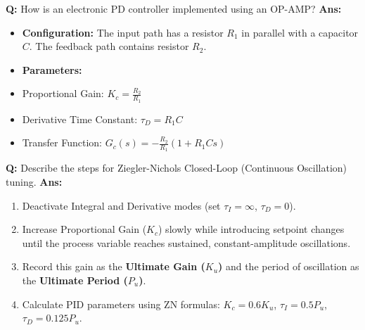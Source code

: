 \documentclass[10pt,a4paper,twocolumn]{article}
\begin{document}
\begin{tcolorbox}[
  colback=white,
  colframe=UnitColorTwo,
  colbacktitle=gray!10!white,
  coltitle=black,
  fonttitle=\bfseries\sffamily\small,
  title={Unit II $\bullet$ Card 7: OP-AMP PD Controller Circuit},
  boxrule=1.2pt,
  arc=2mm,
  outer arc=2mm,
  boxsep=1.5mm,
  top=1mm,
  bottom=1mm,
  left=1.5mm,
  right=1.5mm,
  before skip=2.5mm,
  after skip=2.5mm
]
\textbf{Q:} How is an electronic PD controller implemented using an OP-AMP?
\tcbline
\textbf{Ans:} \begin{itemize}
  \item   \textbf{Configuration:} The input path has a resistor $R_1$ in parallel with a capacitor $C$. The feedback path contains resistor $R_2$.
  \item   \textbf{Parameters:}
  \item   Proportional Gain: $K_c = \frac{R_2}{R_1}$
  \item   Derivative Time Constant: $\tau_D = R_1 C$
  \item   Transfer Function: $G_c(s) = -\frac{R_2}{R_1} (1 + R_1 C s)$
\end{itemize}
\end{tcolorbox}


\begin{tcolorbox}[
  colback=white,
  colframe=UnitColorTwo,
  colbacktitle=gray!10!white,
  coltitle=black,
  fonttitle=\bfseries\sffamily\small,
  title={Unit II $\bullet$ Card 8: Ziegler-Nichols Closed-Loop Tuning},
  boxrule=1.2pt,
  arc=2mm,
  outer arc=2mm,
  boxsep=1.5mm,
  top=1mm,
  bottom=1mm,
  left=1.5mm,
  right=1.5mm,
  before skip=2.5mm,
  after skip=2.5mm
]
\textbf{Q:} Describe the steps for Ziegler-Nichols Closed-Loop (Continuous Oscillation) tuning.
\tcbline
\textbf{Ans:} \begin{enumerate}
  \item Deactivate Integral and Derivative modes (set $\tau_I = \infty$, $\tau_D = 0$).
  \item Increase Proportional Gain ($K_c$) slowly while introducing setpoint changes until the process variable reaches sustained, constant-amplitude oscillations.
  \item Record this gain as the \textbf{Ultimate Gain ($K_u$)} and the period of oscillation as the \textbf{Ultimate Period ($P_u$)}.
  \item Calculate PID parameters using ZN formulas: $K_c = 0.6 K_u$, $\tau_I = 0.5 P_u$, $\tau_D = 0.125 P_u$.
\end{enumerate}
\end{tcolorbox}
\end{document}

